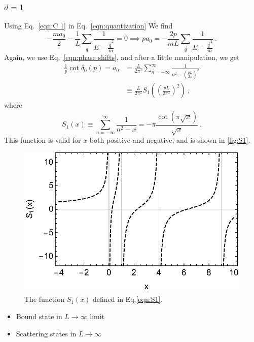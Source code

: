 \documentclass[11pt]{article}
\begin{document}
\subsubsection{$d=1$}
Using Eq.~\eqref{eqn:C 1} in Eq.~\eqref{eqn:quantization} We find
\begin{equation}
-\frac{ma_0}{2}-\frac{1}{L}\sum_{\vec{q}} \frac { 1 } { E - \frac{\vec{q}^2}{m} }=0
\implies
p a_0=-\frac{2p}{mL}\sum_{\vec{q}} \frac { 1 } { E - \frac{\vec{q}^2}{m} }\ .
\end{equation}
Again, we use Eq.~\eqref{eqn:phase shifts}, and after a little manipulation, we get
\begin{align}
\frac{1}{p}\cot\delta_0(p)=a_0&=\frac{L}{2\pi^2}\sum_{n=-\infty}^{\infty} \frac { 1 } { n^2 -\left(\frac{pL}{2\pi}\right)^2}\\
 &\equiv\frac{L}{2\pi^2} S_1\left(\left(\frac{pL}{2\pi^2}\right)^2\right)\ ,
\end{align}
where
\begin{equation}\label{eqn:S1}
S_1(x)\equiv\sum_{n=-\infty}^{\infty} \frac { 1 } { n^2 -x}=-\pi\frac{\cot(\pi\sqrt{x})}{\sqrt{x}}\ .
\end{equation}
This function is valid for $x$ both positive and negative, and is shown in \autoref{fig:S1}.
\begin{figure}
\center
\includegraphics[width=.8\columnwidth]{figure/S1.pdf}
\caption{The function $S_1(x)$ defined in Eq.\eqref{eqn:S1}.\label{fig:S1}}
\end{figure}

\begin{itemize}
\item Bound state in $L\to\infty$ limit
\item Scattering states in $L\to\infty$
\end{itemize}
\end{document}
